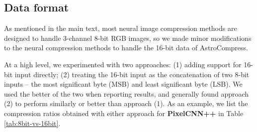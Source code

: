 \subsection{Data format} \label{app:data_format}
As mentioned in the main text, most neural image compression methods are designed to handle 3-channel 8-bit RGB images, so we made minor modifications to the neural compression methods to handle the 16-bit data of AstroCompress. 

At a high level, we experimented with two approaches: (1) adding support for 16-bit input directly; (2) treating the 16-bit input as the concatenation of two 8-bit inputs -- the most significant byte (MSB) and least significant byte (LSB).  We used the better of the two when reporting results, and generally found approach (2) to perform similarly or better than approach (1). 
As an example, we list the compression ratios obtained with either approach for \textbf{PixelCNN++} in Table \ref{tab:8bit-vs-16bit}.

